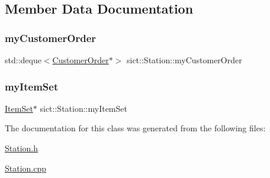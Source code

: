 \subsection{Member Data Documentation}
\mbox{\label{classsict_1_1Station_a82773fd8f7c3e60dfdec18fb9cde0e23}} 
\subsubsection{\texorpdfstring{myCustomerOrder}{myCustomerOrder}}
{\footnotesize\ttfamily std\+::deque$<$\mbox{\hyperlink{classsict_1_1CustomerOrder}{Customer\+Order}}$\ast$$>$ sict\+::\+Station\+::my\+Customer\+Order\hspace{0.3cm}{\ttfamily [private]}}

\mbox{\label{classsict_1_1Station_aaf7c62274d4e6cd3c9f76d7f2f7625b6}} 
\subsubsection{\texorpdfstring{myItemSet}{myItemSet}}
{\footnotesize\ttfamily \mbox{\hyperlink{classsict_1_1ItemSet}{Item\+Set}}$\ast$ sict\+::\+Station\+::my\+Item\+Set\hspace{0.3cm}{\ttfamily [private]}}



The documentation for this class was generated from the following files\+:\begin{DoxyCompactItemize}
\item 
\mbox{\hyperlink{Station_8h}{Station.\+h}}\item 
\mbox{\hyperlink{Station_8cpp}{Station.\+cpp}}\end{DoxyCompactItemize}
